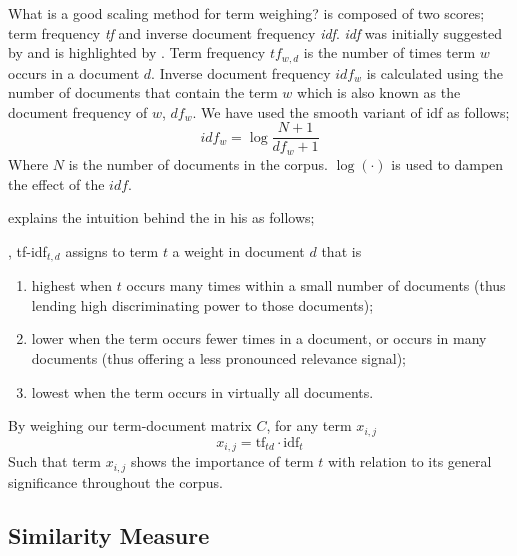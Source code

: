 What is a good scaling method for term weighing?
\tfidf{} is composed of two scores; term frequency \emph{tf} and inverse document frequency \emph{idf}.
\emph{idf} was initially suggested by \textcite{jones_statistical_1972} and is highlighted by \textcite{manning_introduction_2009}.
Term frequency $tf_{w,d}$ is the number of times term $w$ occurs in a document $d$.
Inverse document frequency $idf_{w}$ is calculated using the number of documents that contain the term $w$ which is also known as the document frequency of $w$, $df_w$.
We have used the smooth variant of idf as follows;
\begin{equation}
    idf_w = \log{\frac{N + 1}{df_w + 1}}
\end{equation}
Where $N$ is the number of documents in the corpus. $\log(\cdot)$ is used to dampen the effect of the $idf$.

\citeauthor{manning_introduction_2009} explains the intuition behind the \tfidf{} in his  as follows;
\begin{displayquote}
    \textelp{}, tf-idf$_{t,d}$ assigns to term $t$ a weight in document $d$ that is
    \begin{enumerate}
        \item highest when $t$ occurs many times within a small number of documents (thus lending high discriminating power to those documents);
        \item lower when the term occurs fewer times in a document, or occurs in many documents (thus offering a less pronounced relevance signal);
        \item lowest when the term occurs in virtually all documents.
    \end{enumerate}
\end{displayquote}
By weighing our term-document matrix $C$, for any term $x_{i,j}$
\begin{equation}
x_{i,j} = \text{tf}_{td} \cdot \text{idf}_{t} \end{equation}
Such that term $x_{i,j}$ shows the importance of term $t$ with relation to its general significance throughout the corpus.


\subsection{Similarity Measure}%
\label{sub:similarity_measure}

